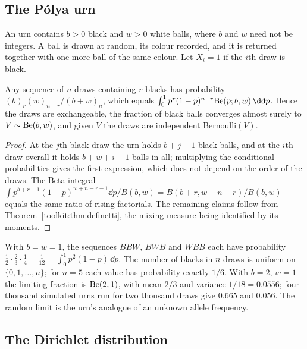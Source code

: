 \subsection{The P\'olya urn}\label{toolkit:sec:polya}

\begin{definition}\label{toolkit:def:polya}
An urn contains $b>0$ black and $w>0$ white balls, where $b$ and $w$ need not be integers. A ball
is drawn at random, its colour recorded, and it is returned together with one more ball of the
same colour. Let $X_i=1$ if the $i$th draw is black.
\end{definition}

\begin{proposition}\label{toolkit:prop:polya}
Any sequence of $n$ draws containing $r$ blacks has probability $(b)_r(w)_{n-r}/(b+w)_n$, which
equals $\int_0^1p^r(1-p)^{n-r}\Be(p;b,w)\,\dd p$. Hence the draws are exchangeable, the fraction of
black balls converges almost surely to $V\sim\mathrm{Be}(b,w)$, and given $V$ the draws are independent
Bernoulli$(V)$.
\end{proposition}

\begin{proof}
At the $j$th black draw the urn holds $b+j-1$ black balls, and at the $i$th draw overall it holds
$b+w+i-1$ balls in all; multiplying the conditional probabilities gives the first expression,
which does not depend on the order of the draws. The Beta integral
$\int p^{b+r-1}(1-p)^{w+n-r-1}\dd p/B(b,w)=B(b+r,w+n-r)/B(b,w)$ equals the same ratio of rising
factorials. The remaining claims follow from Theorem~\ref{toolkit:thm:definetti}, the mixing
measure being identified by its moments.
\end{proof}

\begin{example}\label{toolkit:ex:polya}
With $b=w=1$, the sequences $BBW$, $BWB$ and $WBB$ each have probability
$\tfrac12\cdot\tfrac23\cdot\tfrac14=\tfrac1{12}=\int_0^1p^2(1-p)\,\dd p$. The number of blacks in
$n$ draws is uniform on $\{0,1,\dots,n\}$; for $n=5$ each value has probability exactly $1/6$. With
$b=2$, $w=1$ the limiting fraction is $\mathrm{Be}(2,1)$, with mean $2/3$ and variance $1/18=0.0556$; four
thousand simulated urns run for two thousand draws give $0.665$ and $0.056$. The random limit is
the urn's analogue of an unknown allele frequency.
\end{example}

\subsection{The Dirichlet distribution}\label{toolkit:sec:dirichlet}


